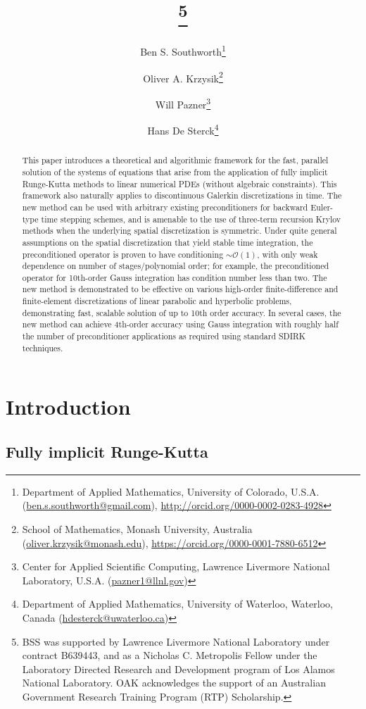 \documentclass[review]{siamart}
\title{{\TheTitle}\thanks{BSS was supported by Lawrence Livermore National 
      Laboratory under contract B639443, and as a Nicholas C. Metropolis Fellow
      under the Laboratory Directed Research and Development program of Los
      Alamos National Laboratory. OAK acknowledges the support of an Australian
      Government Research Training Program (RTP) Scholarship.}}
\author{
	Ben S. Southworth\thanks{Department of Applied Mathematics,
    University of Colorado,
    U.S.A. (\url{ben.s.southworth@gmail.com}),
    \url{http://orcid.org/0000-0002-0283-4928}}
\and
    Oliver A. Krzysik\thanks{School of Mathematics, Monash University,
  	Australia (\url{oliver.krzysik@monash.edu}),
  	\url{https://orcid.org/0000-0001-7880-6512}}
\and
  	Will Pazner\thanks{Center for Applied Scientific Computing, Lawrence Livermore National Laboratory,
    U.S.A. (\url{pazner1@llnl.gov})}
\and
    Hans De Sterck\thanks{Department of Applied Mathematics,
  	University of Waterloo,
  	Waterloo, Canada
  	(\url{hdesterck@uwaterloo.ca})}
}
\begin{document}
\maketitle
\allowdisplaybreaks

\begin{abstract}
This paper introduces a theoretical and algorithmic framework for the fast,
parallel solution of the systems of equations that arise from the application of
fully implicit Runge-Kutta methods to linear numerical PDEs (without algebraic
constraints). This framework also naturally applies to discontinuous Galerkin
discretizations in time. The new method can be used with arbitrary existing
preconditioners for backward Euler-type time stepping schemes, and is amenable
to the use of three-term recursion Krylov methods when the underlying spatial
discretization is symmetric. Under quite general assumptions on the spatial
discretization that yield stable time integration, the preconditioned operator
is proven to have conditioning $\sim\mathcal{O}(1)$, with only weak dependence
on number of stages/polynomial order; for example, the preconditioned operator for
10th-order Gauss integration has condition number less than two. The new method is
demonstrated to be effective on various high-order finite-difference and finite-element
discretizations of linear parabolic and hyperbolic problems, demonstrating fast,
scalable solution of up to 10th order accuracy. In several cases, the new method
can achieve 4th-order accuracy using Gauss integration with roughly half the
number of preconditioner applications as required using standard SDIRK
techniques.
\end{abstract}


\section{Introduction}\label{sec:intro}

\subsection{Fully implicit Runge-Kutta}\label{sec:intro:irk}
\end{document}
